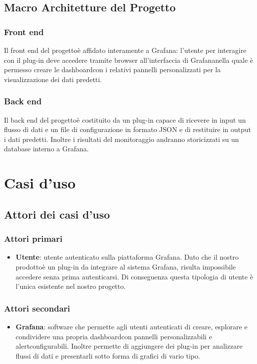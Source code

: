 	\subsection{Macro Architetture del Progetto}
		\subsubsection{Front end}
		Il front end del progetto\glosp è affidato interamente a Grafana\glo: l'utente per interagire con il plug-in deve accedere tramite browser all'interfaccia di Grafana\glosp nella quale è permesso creare le dashboard\glosp con i relativi pannelli personalizzati per la visualizzazione dei dati predetti. 
		\subsubsection{Back end}
		Il back end del progetto\glosp è costituito da un plug-in capace di ricevere in input un flusso di dati e un file di configurazione in formato JSON e di restituire in output i dati predetti. Inoltre i risultati del monitoraggio andranno storicizzati su un database interno a Grafana\glo.
\section{Casi d'uso}
	\subsection{Attori dei casi d'uso}
		\subsubsection{Attori primari}
		\begin{itemize}
			\item \textbf{Utente}: utente autenticato sulla piattaforma Grafana\glo. Dato che il nostro prodotto\glosp è un plug-in da integrare al sistema Grafana\glo, risulta impossibile accedere senza prima autenticarsi. Di conseguenza questa tipologia di utente è l'unica esistente nel nostro progetto\glo.
		\end{itemize}
		\subsubsection{Attori secondari}
		\begin{itemize}
			\item \textbf{Grafana}\glo: software che permette agli utenti autenticati di creare, esplorare e condividere una propria dashboard\glosp con pannelli personalizzabili e alert\glosp configurabili. Inoltre permette di aggiungere dei plug-in per analizzare flussi di dati e presentarli sotto forma di grafici di vario tipo.
		\end{itemize}